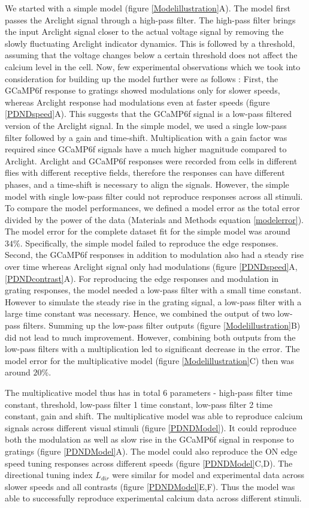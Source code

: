 \documentclass[9pt,lineno]{elife}
\begin{document}
We started with a simple model (figure \ref{Modelillustration}A). The model first passes the Arclight signal through a high-pass filter. The high-pass filter brings the input Arclight signal closer to the actual voltage signal by removing the slowly fluctuating Arclight indicator dynamics. This is followed by a threshold, assuming that the voltage changes below a certain threshold does not affect the calcium level in the cell. Now, few experimental observations which we took into consideration for building up the model further were as follows : First, the GCaMP6f response to gratings showed modulations only for slower speeds, whereas Arclight response had modulations even at faster speeds (figure \ref{PDNDspeed}A). This suggests that the GCaMP6f signal is a low-pass filtered version of the Arclight signal. In the simple model, we used a single low-pass filter followed by a gain and time-shift. Multiplication with a gain factor was required since GCaMP6f signals have a much higher magnitude compared to Arclight. Arclight and GCaMP6f responses were recorded from cells in different flies with different receptive fields, therefore the responses can have different phases, and a time-shift is necessary to align the signals. However, the simple model with single low-pass filter could not reproduce responses across all stimuli. To compare the model performances, we defined a model error as the total error divided by the power of the data (Materials and Methods equation \eqref{modelerror}). The model error for the complete dataset fit for the simple model was around $34\%$. Specifically, the simple model failed to reproduce the edge responses. Second, the GCaMP6f responses in addition to modulation also had a steady rise over time whereas Arclight signal only had modulations (figure \ref{PDNDspeed}A, \ref{PDNDcontrast}A). For reproducing the edge responses and modulation in grating responses, the model needed a low-pass filter with a small time constant. However to simulate the steady rise in the grating signal, a low-pass filter with a large time constant was necessary. Hence, we combined the output of two low-pass filters. Summing up the low-pass filter outputs (figure \ref{Modelillustration}B) did not lead to much improvement. However, combining both outputs from the low-pass filters with a multiplication led to significant decrease in the error. The model error for the multiplicative model (figure \ref{Modelillustration}C) then was around $20\%$. 

The multiplicative model thus has in total 6 parameters - high-pass filter time constant, threshold, low-pass filter 1 time constant, low-pass filter 2 time constant, gain and shift.  The multiplicative model was able to reproduce calcium signals across different visual stimuli (figure \ref{PDNDModel}). It could reproduce both the modulation as well as slow rise in the GCaMP6f signal in response to gratings (figure \ref{PDNDModel}A). The model could also reproduce the ON edge speed tuning responses across different speeds (figure \ref{PDNDModel}C,D). The directional tuning index $L_{dir}$ were similar for model and experimental data across slower speeds and all contrasts (figure \ref{PDNDModel}E,F). Thus the model was able to successfully reproduce experimental calcium data across different stimuli.  
\end{document}
